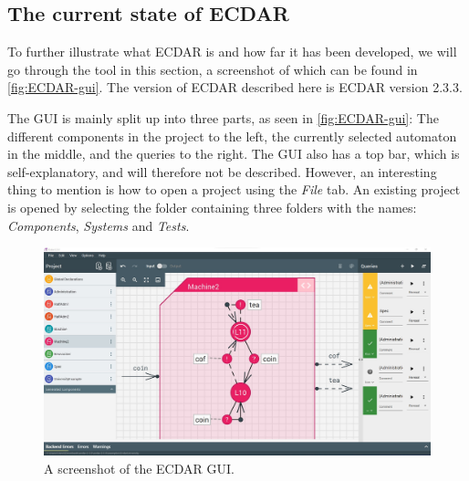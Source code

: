 \subsection{The current state of ECDAR}\label{sub:the-current-state-of-ecdar} %
To further illustrate what ECDAR is and how far it has been developed, we will go through the tool in this section, a screenshot of which can be found in \autoref{fig:ECDAR-gui}. 
The version of ECDAR described here is ECDAR version 2.3.3. %

The GUI is mainly split up into three parts, as seen in \autoref{fig:ECDAR-gui}: The different components in the project to the left, the currently selected automaton in the middle, and the queries to the right.
The GUI also has a top bar, which is self-explanatory, and will therefore not be described.
However, an interesting thing to mention is how to open a project using the \textit{File} tab.
An existing project is opened by selecting the folder containing three folders with the names: \textit{Components}, \textit{Systems} and \textit{Tests}.

\begin{figure}[H]
    \centering
    \includegraphics[width=1\textwidth]{common/figures/ecdar-overview.jpg}
    \caption{A screenshot of the ECDAR GUI.}
    \label{fig:ECDAR-gui}
\end{figure}

